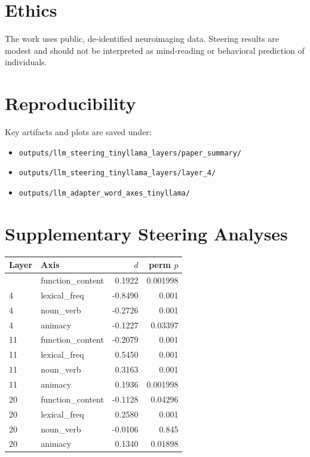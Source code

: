 \documentclass[
]{article}
\begin{document}
\section{Ethics}\label{ethics}

The work uses public, de-identified neuroimaging data. Steering results
are modest and should not be interpreted as mind-reading or behavioral
prediction of individuals.

\section{Reproducibility}\label{reproducibility}

Key artifacts and plots are saved under:

\begin{itemize}
\item
  \texttt{outputs/llm\_steering\_tinyllama\_layers/paper\_summary/}
\item
  \texttt{outputs/llm\_steering\_tinyllama\_layers/layer\_4/}
\item
  \texttt{outputs/llm\_adapter\_word\_axes\_tinyllama/}
\end{itemize}

\section{Supplementary Steering
Analyses}\label{supplementary-steering-analyses}

\protect{}\label{tab:steering_summary}
\begin{longtable}[]{@{}llrr@{}}
\toprule\noalign{}
Layer & Axis & \(d\) & perm \(p\) \\
\midrule\noalign{}
\endhead
\bottomrule\noalign{}
\endlastfoot
4 & function\_content & 0.1922 & 0.001998 \\
4 & lexical\_freq & -0.8490 & 0.001 \\
4 & noun\_verb & -0.2726 & 0.001 \\
4 & animacy & -0.1227 & 0.03397 \\
11 & function\_content & -0.2079 & 0.001 \\
11 & lexical\_freq & 0.5450 & 0.001 \\
11 & noun\_verb & 0.3163 & 0.001 \\
11 & animacy & 0.1936 & 0.001998 \\
20 & function\_content & -0.1128 & 0.04296 \\
20 & lexical\_freq & 0.2580 & 0.001 \\
20 & noun\_verb & -0.0106 & 0.845 \\
20 & animacy & 0.1340 & 0.01898 \\
\end{longtable}
\end{document}
